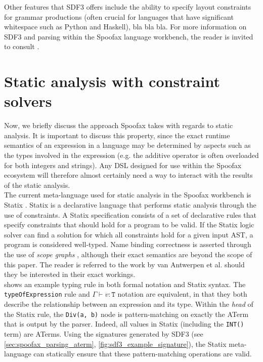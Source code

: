 Other features that SDF3 offers include the ability to specify layout constraints for grammar productions (often crucial for languages that have significant whitespace such as Python and Haskell), bla bla bla. For more information on SDF3 and parsing within the Spoofax language workbench, the reader is invited to consult \cite{KatsV10a, Spoofax2021, Amorim2019, AmorimV20,KallebergV07, WachsmuthKV14}.

\section{\label{sec:spoofax_constraint}Static analysis with constraint solvers}

Now, we briefly discuss the approach Spoofax takes with regards to static analysis. It is important to discuss this property, since the exact runtime semantics of an expression in a language may be determined by aspects such as the types involved in the expression (e.g. the additive operator is often overloaded for both integers and strings). Any \ac{DSL} designed for use within the Spoofax ecosystem will therefore almost certainly need a way to interact with the results of the static analysis.\\

The current meta-language used for static analysis in the Spoofax workbench is Statix \cite{AntwerpenPRV18}. Statix is a declarative language that performs static analysis through the use of constraints. A Statix specification consists of a set of declarative rules that specify constraints that should hold for a program to be valid. If the Statix logic solver can find a solution for which all constraints hold for a given input \ac{AST}, a program is considered well-typed. Name binding correctness is asserted through the use of \textit{scope graphs} \cite{TUD-SERG-2015-009}, although their exact semantics are beyond the scope of this paper. The reader is referred to the work by van Antwerpen et al. \cite{TUD-SERG-2015-009,AntwerpenPRV18,VanAntwerpen2016} should they be interested in their exact workings. \\

 shows an example typing rule in both formal notation and Statix syntax. The \texttt{typeOfExpression} rule and $\Gamma \vdash v : \texttt{T}$ notation are equivalent, in that they both describe the relationship between an expression and its type. Within the \textit{head} of the Statix rule, the \texttt{Div(a, b)} node is pattern-matching on exactly the \ac{ATerm} that is output by the parser. Indeed, all values in Statix (including the \texttt{INT()} term) are \acp{ATerm}. Using the signatures generated by SDF3 (see \cref{sec:spoofax_parsing_aterm}, \cref{fig:sdf3_example_signature}), the Statix meta-language can statically ensure that these pattern-matching operations are valid.\\

